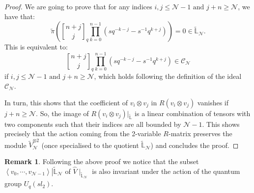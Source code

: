 \documentclass[reqno,a4paper,11pt]{amsart}
\numberwithin{equation}{section}
\numberwithin{figure}{section}
\theoremstyle{definition}
\newtheorem{rmk}[defn]{Remark}
\theoremstyle{plain}
\newcommand{\Li}{{\mathbb L}}
\newcommand{\cC}{\mathcal{C}}
\newcommand{\cN}{\mathcal{N}}
\renewcommand{\geq}{\geqslant}
\renewcommand{\leq}{\leqslant}
\begin{document}
\begin{proof}
We are going to prove that for any indices $i,j \leq \cN-1 \text { and } j+n\geq \cN$,  we have that:
\begin{equation*}
\widetilde{\pi} \left( {n+j \brack j}_q \prod_{k=0}^{n-1}(sq^{-k-j}-s^{-1}q^{k+j}) \right)=0 \in \widetilde{\Li}_{\cN}.
\end{equation*}
%
This is equivalent to:
\begin{equation*}
 {n+j \brack j}_q \prod_{k=0}^{n-1}(sq^{-k-j}-s^{-1}q^{k+j}) \in \cC_{\cN}
 \end{equation*}
if $i,j \leq \cN-1 \text { and } j+n\geq \cN$, {which holds following the definition of the ideal $\cC_{\cN}$}.
\par
In turn, this shows that the coefficient of $v_i\otimes v_j$ in $R(v_i\otimes v_j)$ vanishes if  $j+n\geq \cN$. So, the image of $ R(v_i\otimes v_j)|_{\widetilde{\Li}}$  is a linear combination of tensors with two components such that their indices are all bounded by  $\cN-1$. This shows precisely that the action coming from the 2-variable $R$-matrix preserves the module $\widetilde{V}_{\cN}^{\otimes 2}$ (once specialised to the quotient $\widetilde{\Li}_{\cN}$) and concludes the proof.
\end{proof}
%
\begin{rmk}
Following the above proof we notice that %
the subset $\left.\left<v_0, \cdots\!, v_{\cN-1}\right>\right|{\widetilde\Li_\cN}$ of $\hat V\mid_{\widetilde\Li_\cN}$ is also invariant under the action of the quantum group $U_q(sl_2)$.  
\end{rmk}
%
%
\end{document}
